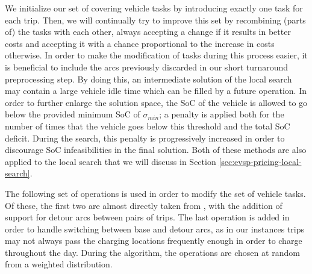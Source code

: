 \documentclass[]{article}
\begin{document}
We initialize our set of covering vehicle tasks by introducing exactly one task for each trip. Then, we will continually try to improve this set by recombining (parts of) the tasks with each other, always accepting a change if it results in better costs and accepting it with a chance proportional to the increase in costs otherwise. In order to make the modification of tasks during this process easier, it is beneficial to include the arcs previously discarded in our short turnaround preprocessing step. By doing this, an intermediate solution of the local search may contain a large vehicle idle time which can be filled by a future operation. In order to further enlarge the solution space, the SoC of the vehicle is allowed to go below the provided minimum SoC of $\sigma_{min}$; a penalty is applied both for the number of times that the vehicle goes below this threshold and the total SoC deficit. During the search, this penalty is progressively increased in order to discourage SoC infeasibilities in the final solution. Both of these methods are also applied to the local search that we will discuss in Section \ref{sec:evsp-pricing-local-search}.

The following set of operations is used in order to modify the set of vehicle tasks. Of these, the first two are almost directly taken from \citet{Bosch21}, with the addition of support for detour arcs between pairs of trips. The last operation is added in order to handle switching between base and detour arcs, as in our instances trips may not always pass the charging locations frequently enough in order to charge throughout the day. During the algorithm, the operations are chosen at random from a weighted distribution.
\end{document}
